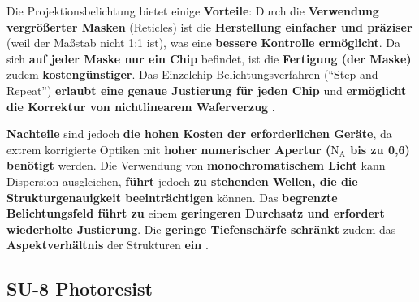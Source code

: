 \documentclass{article} %
\begin{document}
\vspace{1em}

Die Projektionsbelichtung bietet einige \textbf{Vorteile}: Durch die \textbf{Verwendung vergrößerter Masken} (Reticles) ist die\textbf{ Herstellung einfacher und präziser} (weil der Maßstab nicht 1:1 ist), was eine \textbf{bessere Kontrolle ermöglicht}. Da sich \textbf{auf jeder Maske nur ein Chip} befindet, ist die \textbf{Fertigung (der Maske)} zudem \textbf{kostengünstiger}. Das Einzelchip-Belichtungsverfahren (``Step and Repeat'') \textbf{erlaubt eine genaue Justierung für jeden Chip} und \textbf{ermöglicht die Korrektur von nichtlinearem Waferverzug} \cite{schmid2024}. 

\vspace{1em}

\textbf{Nachteile} sind jedoch \textbf{die hohen Kosten der erforderlichen Geräte}, da extrem korrigierte Optiken mit \textbf{hoher numerischer Apertur ($\mathrm{N_A}$ bis zu 0,6) benötigt} werden. Die Verwendung von \textbf{monochromatischem Licht} kann Dispersion ausgleichen, \textbf{führt} jedoch \textbf{zu stehenden Wellen, die die Strukturgenauigkeit beeinträchtigen} können. Das \textbf{begrenzte Belichtungsfeld führt zu} einem \textbf{geringeren Durchsatz und erfordert wiederholte Justierung}. Die \textbf{geringe Tiefenschärfe schränkt} zudem das \textbf{Aspektverhältnis} der Strukturen \textbf{ein} \cite{schmid2024}.





\vspace{1em}

\subsection{SU-8 Photoresist} %
\end{document}
